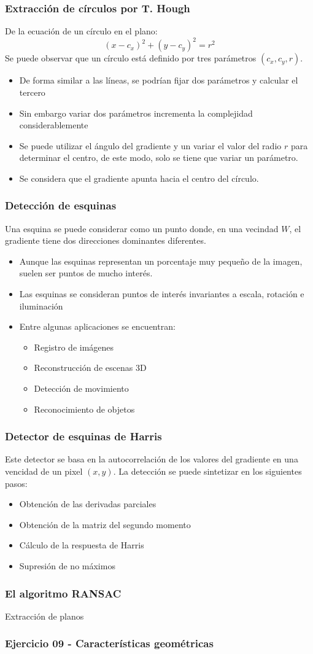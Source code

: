\begin{frame}\frametitle{Extracción de círculos por T. Hough}
  De la ecuación de un círculo en el plano:
  \[(x - c_x)^2 + (y - c_y)^2 = r^2\]
  Se puede observar que un círculo está definido por tres parámetros $(c_x, c_y, r)$.
  \begin{itemize}
  \item De forma similar a las líneas, se podrían fijar dos parámetros y calcular el tercero
  \item Sin embargo variar dos parámetros incrementa la complejidad considerablemente
  \item Se puede utilizar el ángulo del gradiente y un variar el valor del radio $r$ para determinar el centro, de este modo, solo se tiene que variar un parámetro.
  \item Se considera que el gradiente apunta hacia el centro del círculo. 
  \end{itemize}
\end{frame}


\begin{frame}\frametitle{Detección de esquinas}
  Una esquina se puede considerar como un punto donde, en una vecindad $W$, el gradiente tiene dos direcciones dominantes diferentes.
  \begin{itemize}
  \item Aunque las esquinas representan un porcentaje muy pequeño de la imagen, suelen ser puntos de mucho interés.
  \item Las esquinas se consideran puntos de interés invariantes a escala, rotación e iluminación
  \item Entre algunas aplicaciones se encuentran:
    \begin{itemize}
    \item Registro de imágenes
    \item Reconstrucción de escenas 3D
    \item Detección de movimiento
    \item Reconocimiento de objetos
    \end{itemize}
  \end{itemize}
\end{frame}

\begin{frame}\frametitle{Detector de esquinas de Harris}
  Este detector se basa en la autocorrelación de los valores del gradiente en una vencidad de un pixel $(x,y)$. La detección se puede sintetizar en los siguientes pasos:
  \begin{itemize}
  \item Obtención de las derivadas parciales
  \item Obtención de la matriz del segundo momento
  \item Cálculo de la respuesta de Harris
  \item Supresión de no máximos
  \end{itemize}
\end{frame}


\begin{frame}\frametitle{El algoritmo RANSAC}
  Extracción de planos
\end{frame}

\begin{frame}\frametitle{Ejercicio 09 - Características geométricas}
\end{frame}